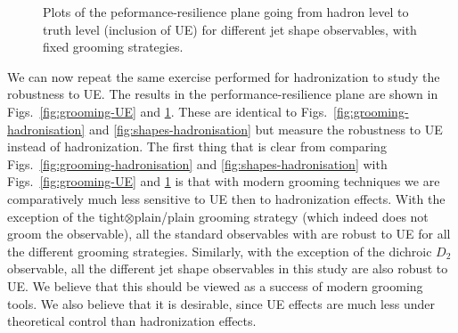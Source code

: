 \documentclass[11pt,letterpaper]{article}
\DeclareRobustCommand{\Figs}[2]{Figs.~\ref{#1} and \ref{#2}}
\begin{document}
\begin{figure}
  \caption{Plots of the peformance-resilience plane going from hadron level to truth level (inclusion of UE) for different jet shape observables, with fixed grooming strategies.}\label{fig:shapes-UE}
\end{figure}


We can now repeat the same exercise performed for hadronization to study the robustness to UE. The results in the performance-resilience plane are shown in \Figs{fig:grooming-UE}{fig:shapes-UE}. These are identical to \Figs{fig:grooming-hadronisation}{fig:shapes-hadronisation} but measure the robustness to UE instead of hadronization. The first thing that is clear from comparing \Figs{fig:grooming-hadronisation}{fig:shapes-hadronisation} with  \Figs{fig:grooming-UE}{fig:shapes-UE} is that with modern grooming techniques we are comparatively much less sensitive to UE then to hadronization effects. With the exception of the tight$\otimes$plain/plain grooming strategy (which indeed does not groom the observable), all the standard observables with are robust to UE for all the different grooming strategies. Similarly, with the exception of the dichroic $D_2$ observable, all the different jet shape observables in this study are also robust to UE. We believe that this should be viewed as a success of modern grooming tools. We also believe that it is desirable, since UE effects are much less under theoretical control than hadronization effects. 
\end{document}
